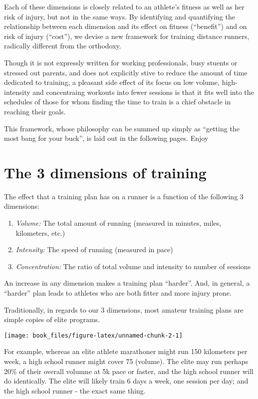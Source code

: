 \documentclass[]{tufte-handout}
\providecommand{\tightlist}{%
  \setlength{\itemsep}{0pt}\setlength{\parskip}{0pt}}
\begin{document}
Each of these dimensions is closely related to an athlete's fitness as
well as her risk of injury, but not in the same ways. By identifying and
quantifying the relationship between each dimension and its effect on
fitness (``benefit'') and on risk of injury (``cost''), we devise a new
framework for training distance runners, radically different from the
orthodoxy.

Though it is not expressly written for working professionals, busy
stuents or stressed out parents, and does not explicitly stive to reduce
the amount of time dedicated to training, a pleasant side effect of its
focus on low volume, high-intensity and concentraing workouts into fewer
sessions is that it fits well into the schedules of those for whom
finding the time to train is a chief obstacle in reaching their goals.

This framework, whose philosophy can be summed up simply as ``getting
the most bang for your buck'', is laid out in the following pages. Enjoy

\section{The 3 dimensions of
training}\label{the-3-dimensions-of-training}

The effect that a training plan has on a runner is a function of the
following 3 dimensions:

\begin{enumerate}
\def\labelenumi{\arabic{enumi}.}
\tightlist
\item
  \emph{Volume:} The total amount of running (measured in minutes,
  miles, kilometers, etc.)
\item
  \emph{Intensity:} The speed of running (measured in pace)
\item
  \emph{Concentration:} The ratio of total volume and intensity to
  number of sessions
\end{enumerate}

An increase in any dimension makes a training plan ``harder''. And, in
general, a ``harder'' plan leads to athletes who are both fitter and
more injury prone.

Traditionally, in regards to our 3 dimensions, most amateur training
plans are simple copies of elite programs.

\texttt{[image: book\_files/figure-latex/unnamed-chunk-2-1]}

For example, whereas an elite athlete marathoner might run 150
kilometers per week, a high school runner might cover 75 (volume). The
elite may run perhaps 20\% of their overall volumne at 5k pace or
faster, and the high school runner will do identically. The elite will
likely train 6 days a week, one session per day; and the high school
runner - the exact same thing.
\end{document}
